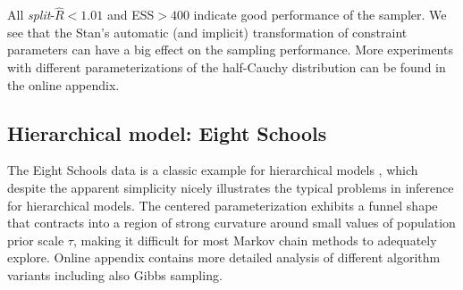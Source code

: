 \documentclass[american,]{article}
\begin{document}


All \emph{split}-\(\widehat{R}<1.01\) and ESS\(>400\) indicate good
performance of the sampler. We see that the Stan's automatic (and
implicit) transformation of constraint parameters can have a big effect
on the sampling performance. More experiments with different
parameterizations of the half-Cauchy distribution can be found in
the online appendix.


\hypertarget{eightschools}{%
\subsection{Hierarchical model: Eight Schools}\label{eightschools}}

The Eight Schools data is a classic example for hierarchical models
\citep[see Section 5.5 in][]{BDA3}, which despite the apparent
simplicity nicely illustrates the typical problems in inference for
hierarchical models. The centered parameterization exhibits a funnel shape
that contracts into a region of strong curvature around small
values of population prior scale $\tau$, making it difficult for most Markov chain
methods to adequately explore.
Online appendix contains more detailed
analysis of different algorithm variants including also Gibbs sampling.
\end{document}
